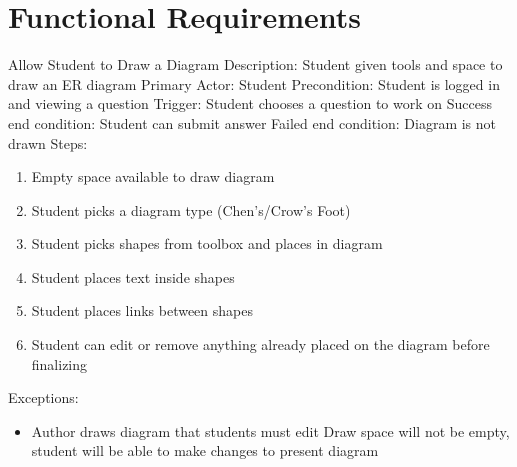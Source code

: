 
    \chapter{Functional Requirements}
    \begin{section}{Allow Student to Draw a Diagram}
        Description: Student given tools and space to draw an ER diagram \newline
        Primary Actor: Student \newline
        Precondition: Student is logged in and viewing a            question \newline
        Trigger: Student chooses a question to work on \newline
        Success end condition: Student can submit answer            \newline
        Failed end condition: Diagram is not drawn \newline
        \newline
        Steps:
        \begin{enumerate}
            \item{Empty space available to draw diagram}
            \item{Student picks a diagram type (Chen's/Crow's Foot)}
            \item{Student picks shapes from toolbox and places in           diagram}
            \item{Student places text inside shapes}
            \item{Student places links between shapes}
            \item{Student can edit or remove anything already placed on the diagram before finalizing}
        \end{enumerate}
        Exceptions:
        \begin{itemize}
            \item{Author draws diagram that students must edit             \newline
                Draw space will not be empty, student will be able to           make changes to present diagram}
        \end{itemize}
    \end{section}

